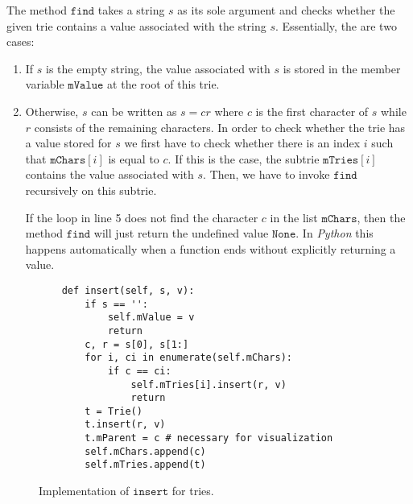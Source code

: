 The method $\texttt{find}$ takes a string $s$ as its sole argument and checks whether the given trie
contains a value associated with the string $s$.  Essentially, the are two cases:
\begin{enumerate}
\item If $s$ is the empty string, the value associated with $s$ is stored in the member variable
      $\texttt{mValue}$ at the root of this trie.
\item Otherwise, $s$ can be written as $s = cr$ where $c$ is the first character of $s$ while $r$
      consists of the remaining characters.  In order to check whether the trie has a value stored
      for $s$ we first have to check whether there is an index $i$ such that $\texttt{mChars}[i]$ is
      equal to $c$.  If this is the case, the subtrie $\texttt{mTries}[i]$ contains the value
      associated with $s$.  Then, we have to invoke $\texttt{find}$ recursively on this subtrie.

      If the loop in line 5 does not find the character $c$ in the list $\texttt{mChars}$, then the method
      $\texttt{find}$ will just return the undefined value $\texttt{None}$.  In \textsl{Python} this happens
      automatically when a function ends without explicitly returning a value.
\end{enumerate}


\begin{figure}[!ht]
\centering
\begin{verbatim}
    def insert(self, s, v):
        if s == '':
            self.mValue = v
            return
        c, r = s[0], s[1:]
        for i, ci in enumerate(self.mChars):
            if c == ci:
                self.mTries[i].insert(r, v)
                return
        t = Trie()
        t.insert(r, v)
        t.mParent = c # necessary for visualization
        self.mChars.append(c)
        self.mTries.append(t)
\end{verbatim}
\vspace*{-0.3cm}
\caption{Implementation of $\texttt{insert}$ for tries.}
\label{fig:trie.ipython-insert}
\end{figure}


